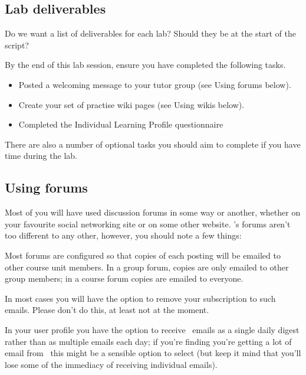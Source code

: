 
\subsection{Lab deliverables}
\label{sec:lab-deliverables}

\begin{note}
  Do we want a list of deliverables for each lab? Should they be at the start of the script?
\end{note}

By the end of this lab session, ensure you have completed the following tasks.

\begin{itemize}
\item 
Posted a welcoming message to your tutor group (see Using forums below).

\item Create your set of practise wiki pages (see Using wikis below).

\item Completed the Individual Learning Profile questionnaire
\end{itemize}

There are also a number of optional tasks you should aim to complete if you have time during the lab.

\subsection{Using forums}
\label{sec:using-forums}


Most of you will have used discussion forums in some way or another, whether on your favourite social networking site or on some other website. \Moodle's forums aren't too different to any other, however, you should note a few things:

Most forums are configured so that copies of each posting will be emailed to other course unit members. In a group forum, copies are only emailed to other group members; in a course forum copies are emailed to everyone.

In most cases you will have the option to remove your subscription to such emails. Please don't do this, at least not at the moment.

In your user profile you have the option to receive \moodle\ emails as a single daily digest rather than as multiple emails each day; if you're finding you're getting a lot of email from \moodle\ this might be a sensible option to select (but keep it mind that you'll lose some of the immediacy of receiving individual emails). 

